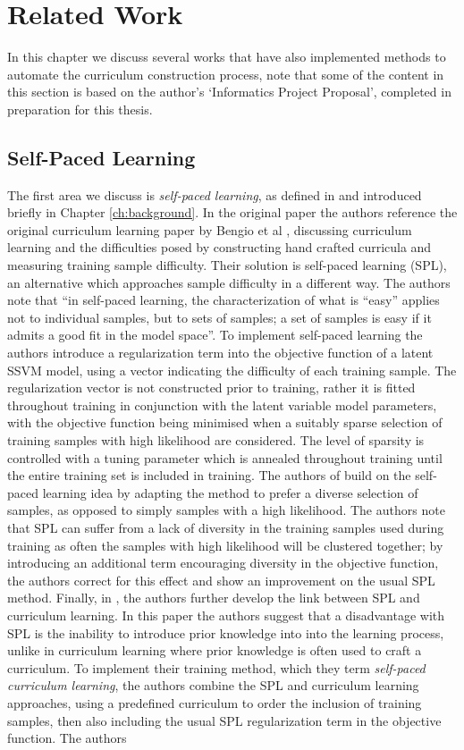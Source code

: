 \chapter{Related Work}\label{Related Work}
In this chapter we discuss several works that have also implemented methods to automate the curriculum construction process, note that some of the content in this section is based on the author's `Informatics Project Proposal', completed in preparation for this thesis.
\section{Self-Paced Learning}
The first area we discuss is \textit{self-paced learning}, as defined in \cite{kumar2010self} and introduced briefly in Chapter \ref{ch:background}. In the original paper the authors reference the original curriculum learning paper by Bengio et al \cite{Bengio2009}, discussing curriculum learning and the difficulties posed by constructing hand crafted curricula and measuring training sample difficulty. Their solution is self-paced learning (SPL), an alternative which approaches sample difficulty in a different way. The authors note that ``in self-paced learning, the characterization of what is “easy” applies not to individual samples, but to sets of samples; a set of samples is easy if it admits a good fit in the model space''. To implement self-paced learning the authors introduce a regularization term into the objective function of a latent SSVM \cite{felzenszwalb2008discriminatively} model, using a vector indicating the difficulty of each training sample. The regularization vector is not constructed prior to training, rather it is fitted throughout training in conjunction with the latent variable model parameters, with the objective function being minimised when a suitably sparse selection of training samples with high likelihood are considered. The level of sparsity is controlled with a tuning parameter which is annealed throughout training until the entire training set is included in training. The authors of \cite{jiang2014self} build on the self-paced learning idea by adapting the method to prefer a diverse selection of samples, as opposed to simply samples with a high likelihood. The authors note that SPL can suffer from a lack of diversity in the training samples used during training as often the samples with high likelihood will be clustered together; by introducing an additional term encouraging diversity in the objective function, the authors correct for this effect and show an improvement on the usual SPL method. Finally, in \cite{jiang2015self}, the authors further develop the link between SPL and curriculum learning. In this paper the authors suggest that a disadvantage with SPL is the inability to introduce prior knowledge into into the learning process, unlike in curriculum learning where prior knowledge is often used to craft a curriculum. To implement their training method, which they term \textit{self-paced curriculum learning}, the authors combine the SPL and curriculum learning approaches, using a predefined curriculum to order the inclusion of training samples, then also including the usual SPL regularization term in the objective function. The authors 